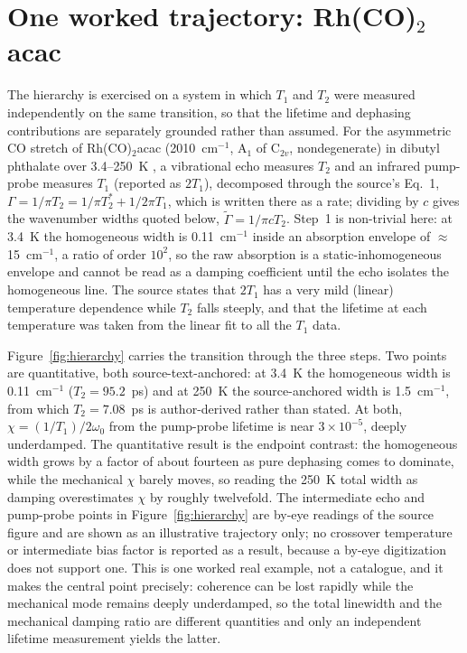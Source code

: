 \section{One worked trajectory: Rh(CO)\texorpdfstring{$_2$}{2}acac}

The hierarchy is exercised on a system in which $T_1$ and $T_2$ were measured independently on the same transition, so that the lifetime and dephasing contributions are separately grounded rather than assumed. For the asymmetric CO stretch of Rh(CO)$_2$acac (2010~cm$^{-1}$, A$_1$ of C$_{2v}$, nondegenerate) in dibutyl phthalate over 3.4--250~K \citep{rectorfayer}, a vibrational echo measures $T_2$ and an infrared pump-probe measures $T_1$ (reported as $2T_1$), decomposed through the source's Eq.~1, $\Gamma = 1/\pi T_2 = 1/\pi T_2^* + 1/2\pi T_1$, which is written there as a rate; dividing by $c$ gives the wavenumber widths quoted below, $\widetilde{\Gamma} = 1/\pi c T_2$. Step~1 is non-trivial here: at 3.4~K the homogeneous width is 0.11~cm$^{-1}$ inside an absorption envelope of $\approx$15~cm$^{-1}$, a ratio of order $10^2$, so the raw absorption is a static-inhomogeneous envelope and cannot be read as a damping coefficient until the echo isolates the homogeneous line. The source states that $2T_1$ has a very mild (linear) temperature dependence while $T_2$ falls steeply, and that the lifetime at each temperature was taken from the linear fit to all the $T_1$ data.

Figure~\ref{fig:hierarchy} carries the transition through the three steps. Two points are quantitative, both source-text-anchored: at 3.4~K the homogeneous width is 0.11~cm$^{-1}$ ($T_2 = 95.2$~ps) and at 250~K the source-anchored width is 1.5~cm$^{-1}$, from which $T_2 = 7.08$~ps is author-derived rather than stated. At both, $\chi = (1/T_1)/2\omega_0$ from the pump-probe lifetime is near $3\times10^{-5}$, deeply underdamped. The quantitative result is the endpoint contrast: the homogeneous width grows by a factor of about fourteen as pure dephasing comes to dominate, while the mechanical $\chi$ barely moves, so reading the 250~K total width as damping overestimates $\chi$ by roughly twelvefold. The intermediate echo and pump-probe points in Figure~\ref{fig:hierarchy} are by-eye readings of the source figure and are shown as an illustrative trajectory only; no crossover temperature or intermediate bias factor is reported as a result, because a by-eye digitization does not support one. This is one worked real example, not a catalogue, and it makes the central point precisely: coherence can be lost rapidly while the mechanical mode remains deeply underdamped, so the total linewidth and the mechanical damping ratio are different quantities and only an independent lifetime measurement yields the latter.

